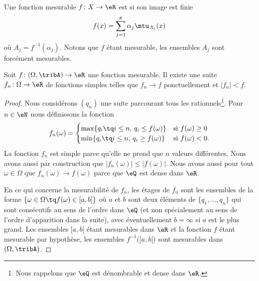 \begin{definition}  \label{DefBPCxdel}
Une fonction mesurable \( f\colon X\to \eR\) est  si son image est finie
\begin{equation}
    f(x)=\sum_{j=1}^p\alpha_j\mtu_{A_j}(x)
\end{equation}
où \( A_j=f^{-1}(\alpha_j)\). Notons que \( f\) étant mesurable, les ensembles \( A_j\) sont forcément mesurables.
\end{definition}

\begin{lemma}    \label{LemYFoWqmS}
    Soit \( f\colon (\Omega,\tribA)\to \eR\) une fonction mesurable. Il existe une suite \( f_n\colon \Omega\to \eR\) de fonctions simples telles que \( f_n\to f\) ponctuellement et \( | f_n |<f\).
\end{lemma}

\begin{proof}
    Nous considérons \( (q_n)\) une suite parcourant tous les rationnels\footnote{Nous rappelons que \( \eQ\) est dénombrable et dense dans \( \eR\).}.
    Pour \( n\in \eN\) nous définissons la fonction
    \begin{equation}
        f_n(\omega)=\begin{cases}
            \max\{ q_i\tq i\leq n,\, q_i\leq f(\omega) \}    &   \text{si \( f(\omega)\geq 0\)}\\
            \min\{ q_i\tq i\leq n,\, q_i\geq f(\omega) \}    &    \text{si \( f(\omega)< 0\).}
        \end{cases}
    \end{equation}
    La fonction \( f_n\) est simple parce qu'elle ne prend que \( n\) valeurs différentes. Nous avons aussi par construction que \( | f_n(\omega)|\leq |f(\omega) |\). Nous avons aussi pour tout \( \omega\in \Omega\) que \( f_n(\omega)\to f(\omega)\) parce que \( \eQ\) est dense dans \( \eR\).

    En ce qui concerne la mesurabilité de \( f_n\), les étages de \( f_n\) sont les ensembles de la forme \( \{ \omega\in \Omega\tq f(\omega)\in\mathopen[ a , b [ \}\) où \( a\) et \( b\) sont deux éléments de \( \{ q_1,\ldots, q_n \}\) qui sont consécutifs au sens de l'ordre dans \( \eQ\) (et non spécialement au sens de l'ordre d'apparition dans la suite), avec éventuellement \( b=\infty\) si \( a\) est le plus grand. Les ensembles \( \mathopen[ a , b [\) étant mesurables dans \( \eR\) et la fonction \( f\) étant mesurable par hypothèse, les ensembles \( f^{-1}\Big( \mathopen[ a , b [ \Big)\) sont mesurables dans \( (\Omega,\tribA)\).
\end{proof}


